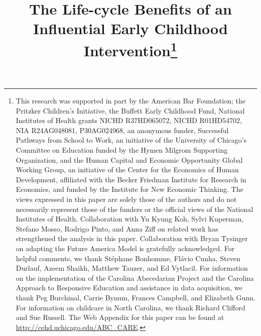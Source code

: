 


\newcommand*\leftright[2]{%
  \leavevmode
  \rlap{#1}%
  \hspace{0.5\linewidth}%
  #2}

\newcommand{\orth}{\ensuremath{\perp\!\!\!\perp}}%
\newcommand{\indep}{\orth}%
\newcommand{\notorth}{\ensuremath{\perp\!\!\!\!\!\!\diagup\!\!\!\!\!\!\perp}}%
\newcommand{\notindep}{\notorth}





\begin{titlepage}

\title{\Large \textbf{The Life-cycle Benefits of an Influential Early Childhood Intervention}\thanks{This research was supported in part by the American Bar Foundation; the Pritzker Children's Initiative, the Buffett Early Childhood Fund, National Institutes of Health grants NICHD R37HD065072, NICHD R01HD54702, NIA R24AG048081, P30AG024968, an anonymous funder, Successful Pathways from School to Work, an initiative of the University of Chicago's Committee on Education funded by the Hymen Milgrom Supporting Organization, and the Human Capital and Economic Opportunity Global Working Group, an initiative of the Center for the Economics of Human Development, affiliated with the Becker Friedman Institute for Research in Economics, and funded by the Institute for New Economic Thinking. The views expressed in this paper are solely those of the authors and do not necessarily represent those of the funders or the official views of the National Institutes of Health. Collaboration with Yu Kyung Koh, Sylvi Kuperman, Stefano Mosso, Rodrigo Pinto, and Anna Ziff on related work has strengthened the analysis in this paper. Collaboration with Bryan Tysinger on adapting the Future America Model is gratefully acknowledged. For helpful comments, we thank St\'{e}phane Bonhomme, Fl\'{a}vio Cunha, Steven Durlauf, Azeem Shaikh, Matthew Tauzer, and Ed Vytlacil. For information on the implementation of the Carolina Abecedarian Project and the Carolina Approach to Responsive Education and assistance in data acquisition, we thank Peg Burchinal, Carrie Bynum, Frances Campbell, and Elizabeth Gunn. For information on childcare in North Carolina, we thank Richard Clifford and Sue Russell. The Web Appendix for this paper can be found at \url{http://cehd.uchicago.edu/ABC_CARE}.}}


\end{titlepage}
